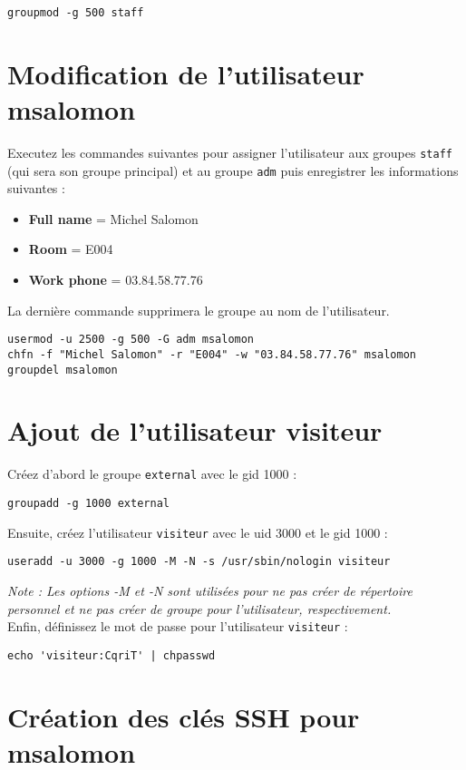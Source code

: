 \begin{lstlisting}
groupmod -g 500 staff
\end{lstlisting}

\section{Modification de l'utilisateur msalomon}

Executez les commandes suivantes pour assigner l'utilisateur aux groupes \texttt{staff} (qui sera son groupe principal) et au groupe \texttt{adm} puis enregistrer les informations suivantes :
\begin{itemize}
	\item \textbf{Full name} = Michel Salomon
	\item \textbf{Room} = E004
	\item \textbf{Work phone} = 03.84.58.77.76
\end{itemize}
La dernière commande supprimera le groupe au nom de l'utilisateur.

\begin{lstlisting}
usermod -u 2500 -g 500 -G adm msalomon
chfn -f "Michel Salomon" -r "E004" -w "03.84.58.77.76" msalomon
groupdel msalomon
\end{lstlisting}

\section{Ajout de l'utilisateur visiteur}
Créez d'abord le groupe \texttt{external} avec le gid 1000 :
\begin{lstlisting}
groupadd -g 1000 external
\end{lstlisting}

Ensuite, créez l'utilisateur \texttt{visiteur} avec le uid 3000 et le gid 1000 :
\begin{lstlisting}
useradd -u 3000 -g 1000 -M -N -s /usr/sbin/nologin visiteur
\end{lstlisting}
\emph{Note : Les options -M et -N sont utilisées pour ne pas créer de répertoire personnel et ne pas créer de groupe pour l'utilisateur, respectivement.}\\

Enfin, définissez le mot de passe pour l'utilisateur \texttt{visiteur} :
\begin{lstlisting}
echo 'visiteur:CqriT' | chpasswd
\end{lstlisting}

\section{Création des clés SSH pour msalomon}

